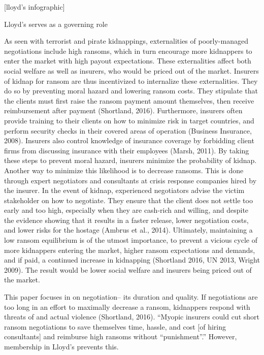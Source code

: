 \documentclass[12pt]{article}
\begin{document}
[lloyd's infographic]

Lloyd's serves as a governing role 

As seen with terrorist and pirate kidnappings, externalities of poorly-managed negotiations include high ransoms, which in turn encourage more kidnappers to enter the market with high payout expectations. These externalities affect both social welfare as well as insurers, who would be priced out of the market. Insurers of kidnap for ransom are thus incentivized to internalize these externalities. They do so by preventing moral hazard and lowering ransom costs. They stipulate that the clients must first raise the ransom payment amount themselves, then receive reimbursement after payment (Shortland, 2016). Furthermore, insurers often provide training to their clients on how to minimize risk in target countries, and perform security checks in their covered areas of operation (Business Insurance, 2008). Insurers also control knowledge of insurance coverage by forbidding client firms from discussing insurance with their employees (Marsh, 2011). By taking these steps to prevent moral hazard, insurers minimize the probability of kidnap. Another way to minimize this likelihood is to decrease ransoms. This is done through expert negotiators and consultants at crisis response companies hired by the insurer. In the event of kidnap, experienced negotiators advise the victim stakeholder on how to negotiate. They ensure that the client does not settle too early and too high, especially when they are cash-rich and willing, and despite the evidence showing that it results in a faster release, lower negotiation costs, and lower risks for the hostage (Ambrus et al., 2014). Ultimately, maintaining a low ransom equilibrium is of the utmost importance, to prevent a vicious cycle of more kidnappers entering the market, higher ransom expectations and demands, and if paid, a continued increase in kidnapping (Shortland 2016, UN 2013, Wright 2009). The result would be lower social welfare and insurers being priced out of the market. 

This paper focuses in on negotiation-- its duration and quality. If negotiations are too long in an effort to maximally decrease a ransom, kidnappers respond with threats of and actual violence (Shortland, 2016). ``Myopic insurers could cut short ransom negotiations to save themselves time, hassle, and cost [of hiring consultants] and reimburse high ransoms without ``punishment''.'' However, membership in Lloyd's prevents this.
\end{document}

